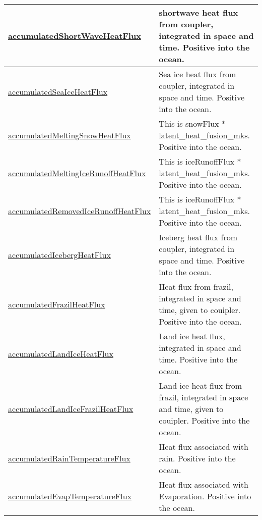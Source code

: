 {\begin{center}
\begin{longtable}{| p{2.0in} | p{4.0in} |}
    \hline
    \hyperref[subsec:var_sec_conservationCheckEnergyAM_accumulatedShortWaveHeatFlux]{accumulatedShortWaveHeatFlux} & shortwave heat flux from coupler, integrated in space and time. Positive into the ocean. \\
    \hline
    \hyperref[subsec:var_sec_conservationCheckEnergyAM_accumulatedSeaIceHeatFlux]{accumulatedSeaIceHeatFlux} & Sea ice heat flux from coupler, integrated in space and time. Positive into the ocean. \\
    \hline
    \hyperref[subsec:var_sec_conservationCheckEnergyAM_accumulatedMeltingSnowHeatFlux]{accumulatedMeltingSnowHeat\-Flux} & This is snowFlux * latent\_heat\_fusion\_mks. Positive into the ocean. \\
    \hline
    \hyperref[subsec:var_sec_conservationCheckEnergyAM_accumulatedMeltingIceRunoffHeatFlux]{accumulatedMeltingIceRunoff\-HeatFlux} & This is iceRunoffFlux * latent\_heat\_fusion\_mks. Positive into the ocean. \\
    \hline
    \hyperref[subsec:var_sec_conservationCheckEnergyAM_accumulatedRemovedIceRunoffHeatFlux]{accumulatedRemovedIceRunoff\-HeatFlux} & This is iceRunoffFlux * latent\_heat\_fusion\_mks. Positive into the ocean. \\
    \hline
    \hyperref[subsec:var_sec_conservationCheckEnergyAM_accumulatedIcebergHeatFlux]{accumulatedIcebergHeatFlux} & Iceberg heat flux from coupler, integrated in space and time. Positive into the ocean. \\
    \hline
    \hyperref[subsec:var_sec_conservationCheckEnergyAM_accumulatedFrazilHeatFlux]{accumulatedFrazilHeatFlux} & Heat flux from frazil, integrated in space and time, given to couipler. Positive into the ocean. \\
    \hline
    \hyperref[subsec:var_sec_conservationCheckEnergyAM_accumulatedLandIceHeatFlux]{accumulatedLandIceHeatFlux} & Land ice heat flux, integrated in space and time. Positive into the ocean. \\
    \hline
    \hyperref[subsec:var_sec_conservationCheckEnergyAM_accumulatedLandIceFrazilHeatFlux]{accumulatedLandIceFrazilHeat\-Flux} & Land ice heat flux from frazil, integrated in space and time, given to couipler. Positive into the ocean. \\
    \hline
    \hyperref[subsec:var_sec_conservationCheckEnergyAM_accumulatedRainTemperatureFlux]{accumulatedRainTemperature\-Flux} & Heat flux associated with rain. Positive into the ocean. \\
    \hline
    \hyperref[subsec:var_sec_conservationCheckEnergyAM_accumulatedEvapTemperatureFlux]{accumulatedEvapTemperature\-Flux} & Heat flux associated with Evaporation. Positive into the ocean. \\

\end{longtable}
\end{center}}
